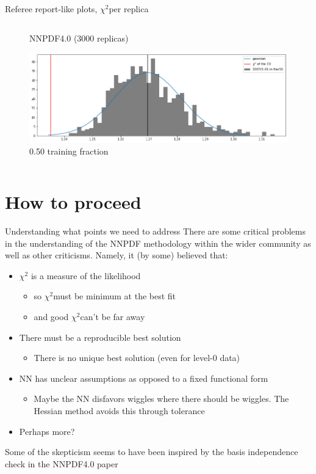 \documentclass[aspectratio=169,10pt]{beamer}
\newcommand{\chitwo}{$\chi^2$}
\begin{document}
\begin{frame}[t]{Referee report-like plots, \chitwo per replica}
\begin{columns}
\begin{column}{0.5\textwidth}
\begin{figure}
        \caption*{\footnotesize  NNPDF4.0 (3000 replicas)}
      \end{figure}
      \vspace*{-0.8cm}
      \begin{figure}
        \includegraphics[height=.3\textheight]{chi2_replicas_0.5trvl.png}
        \caption*{\footnotesize  0.50 training fraction}
      \end{figure}
    \end{column}
  \end{columns}
\end{frame}


\section{How to proceed}

\begin{frame}[t]{Understanding what points we need to address}
  There are some critical problems in the understanding of the NNPDF methodology within the wider community as well as other criticisms. Namely, it (by some) believed that:
  \begin{itemize}
    \item $\chi^2$ is a measure of the likelihood
    \begin{itemize}
      \item so \chitwo must be minimum at the best fit
      \item and good \chitwo can't be far away
    \end{itemize}
    \item There must be a reproducible best solution
    \begin{itemize}
      \item There is no unique best solution (even for level-0 data)
    \end{itemize}
    \item NN has unclear assumptions as opposed to a fixed functional form
    \begin{itemize}
      \item Maybe the NN disfavors wiggles where there should be wiggles. The Hessian method avoids this through tolerance
    \end{itemize}
    \item Perhaps more?
  \end{itemize}
  Some of the skepticism seems to have been inspired by the basis independence check in the NNPDF4.0 paper
\end{frame}
\end{document}
